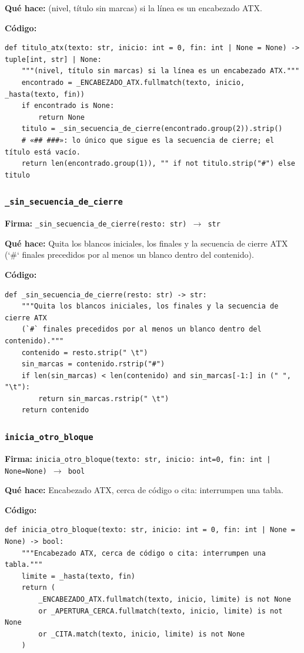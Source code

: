 \documentclass[11pt,a4paper]{article}
\begin{document}
\textbf{Qué hace:} (nivel, título sin marcas) si la línea es un encabezado ATX.

\textbf{Código:}
\begin{lstlisting}
def titulo_atx(texto: str, inicio: int = 0, fin: int | None = None) -> tuple[int, str] | None:
    """(nivel, título sin marcas) si la línea es un encabezado ATX."""
    encontrado = _ENCABEZADO_ATX.fullmatch(texto, inicio, _hasta(texto, fin))
    if encontrado is None:
        return None
    titulo = _sin_secuencia_de_cierre(encontrado.group(2)).strip()
    # «## ###»: lo único que sigue es la secuencia de cierre; el título está vacío.
    return len(encontrado.group(1)), "" if not titulo.strip("#") else titulo
\end{lstlisting}

\subsubsection*{\texttt{\_sin\_secuencia\_de\_cierre}}
\textbf{Firma:} \texttt{\_sin\_secuencia\_de\_cierre(resto: str) $\rightarrow$ str}

\textbf{Qué hace:} Quita los blancos iniciales, los finales y la secuencia de cierre ATX
(`\#` finales precedidos por al menos un blanco dentro del contenido).

\textbf{Código:}
\begin{lstlisting}
def _sin_secuencia_de_cierre(resto: str) -> str:
    """Quita los blancos iniciales, los finales y la secuencia de cierre ATX
    (`#` finales precedidos por al menos un blanco dentro del contenido)."""
    contenido = resto.strip(" \t")
    sin_marcas = contenido.rstrip("#")
    if len(sin_marcas) < len(contenido) and sin_marcas[-1:] in (" ", "\t"):
        return sin_marcas.rstrip(" \t")
    return contenido
\end{lstlisting}

\subsubsection*{\texttt{inicia\_otro\_bloque}}
\textbf{Firma:} \texttt{inicia\_otro\_bloque(texto: str, inicio: int=0, fin: int | None=None) $\rightarrow$ bool}

\textbf{Qué hace:} Encabezado ATX, cerca de código o cita: interrumpen una tabla.

\textbf{Código:}
\begin{lstlisting}
def inicia_otro_bloque(texto: str, inicio: int = 0, fin: int | None = None) -> bool:
    """Encabezado ATX, cerca de código o cita: interrumpen una tabla."""
    limite = _hasta(texto, fin)
    return (
        _ENCABEZADO_ATX.fullmatch(texto, inicio, limite) is not None
        or _APERTURA_CERCA.fullmatch(texto, inicio, limite) is not None
        or _CITA.match(texto, inicio, limite) is not None
    )
\end{lstlisting}
\end{document}
